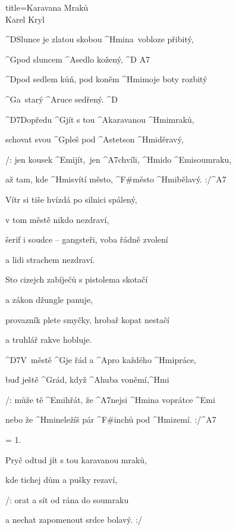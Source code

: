 \begin{song}{title=\predtitle\centering Karavana Mraků \\\large Karel Kryl  \vspace*{-0.3cm}}  %
\begin{centerjustified}

\sloka
	^{D}Slunce je zlatou skobou ^{Hmi\z}na~vobloze přibitý,

	^{G}pod sluncem ^{A}sedlo kožený, ^{D A7}

	^{D}pod sedlem kůň, pod koněm ^{Hmi}moje boty rozbitý

	^{G\z}a~starý ^{A}ruce sedřený. ^{D}

	^{D7}Dopředu ^{G}jít s tou ^{A}karavanou ^{Hmi}mraků,

	schovat svou ^{G}pleš pod ^{A}stetson ^{Hmi}děravý,

	/: jen kousek ^{Emi\z}jít,~jen ^{A7}chvíli, ^{Hmi}do ^{Emi}soumraku,

	až tam, kde ^{Hmi}svítí město, ^{F#}město ^{Hmi}bělavý. :/^{A7}

\sloka
	Vítr si tiše hvízdá po silnici spálený,

	v tom městě nikdo nezdraví,

	šerif i soudce -- gangsteři, voba řádně zvolení

	a lidi strachem nezdraví.

\sloka
	Sto cizejch zabíječů s pistolema skotačí

	a zákon džungle panuje,

	provazník plete smyčky, hrobař kopat nestačí

	a truhlář rakve hobluje.

	^{D7\z}V~městě ^{G}je řád a ^{A}pro každého ^{Hmi}práce,

	 buď ještě ^{G}rád, když ^{A}huba voněmí,^{Hmi}
 
	/: může tě ^{Emi}hřát, že ^{A7}nejsi ^{Hmi}na voprátce ^{Emi}

	nebo že ^{Hmi}neležíš pár ^{F#}inchů pod ^{Hmi}zemí. :/^{A7}

\sloka = 1.

	Pryč odtud jít s tou karavanou mraků,

	kde tichej dům a pušky rezaví,

	/: orat a sít od rána do soumraku

	a nechat zapomenout srdce bolavý. :/

\end{centerjustified}
\setcounter{Slokočet}{0}
\end{song}
